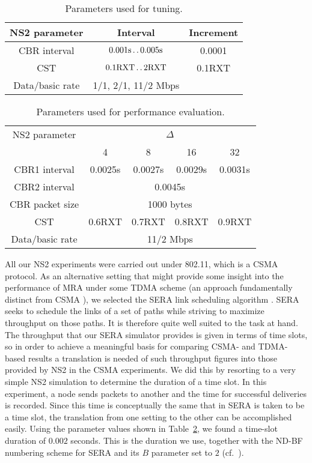 \documentclass{article}
\newcommand{\twoldots}{\mathinner{\ldotp\ldotp}}
\begin{document}
\begin{table}[t]
\centering
\caption{Parameters used for tuning.}
\begin{tabular}{ccc}
\hline
NS2 parameter  & Interval                                    & Increment \\ \hline
CBR interval   & $0.001\textrm{s}\twoldots 0.005\textrm{s}$  & 0.0001    \\
CST            & $0.1\textrm{RXT}\twoldots 2\textrm{RXT}$    & 0.1RXT    \\
Data/basic rate& 1/1, 2/1, 11/2 Mbps                         &           \\
\end{tabular}
 \label{table1}
\end{table}

\begin{table}[t]
\centering
\caption{Parameters used for performance evaluation.}
\begin{tabular}{ccccc}
\hline
NS2 parameter   & \multicolumn{4}{c}{$\Delta$}           \\ \cline{2-5}
                & 4       & 8       & 16      & 32       \\ \hline 
CBR1 interval   & 0.0025s & 0.0027s & 0.0029s & 0.0031s  \\  
CBR2 interval   & \multicolumn{4}{c}{0.0045s}             \\
CBR packet size & \multicolumn{4}{c}{1000 bytes}         \\
CST             & 0.6RXT  & 0.7RXT  & 0.8RXT  & 0.9RXT   \\
Data/basic rate & \multicolumn{4}{c}{11/2 Mbps}          \\
\end{tabular}
 \label{table2}
\end{table}

All our NS2 experiments were carried out under 802.11, which is a CSMA protocol.
As an alternative setting that might provide some insight into the performance
of MRA under some TDMA scheme (an approach fundamentally distinct from CSMA
\cite{Gummalla2000}), we selected the SERA link scheduling algorithm
\cite{Fabio2012}. SERA seeks to schedule the links of a set of paths while
striving to maximize throughput on those paths. It is therefore quite well
suited to the task at hand. The throughput that our SERA simulator provides is
given in terms of time slots, so in order to achieve a meaningful basis for
comparing CSMA- and TDMA-based results a translation is needed of such
throughput figures into those provided by NS2 in the CSMA experiments. We did
this by resorting to a very simple NS2 simulation to determine the duration of
a time slot. In this experiment, a node sends packets to another and the time
for successful deliveries is recorded. Since this time is conceptually the same
that in SERA is taken to be a time slot, the translation from one setting to the
other can be accomplished easily. Using the parameter values shown in
Table~\ref{table2}, we found a time-slot duration of $0.002$ seconds. This is
the duration we use, together with the ND-BF numbering scheme for SERA and its
$B$ parameter set to $2$ (cf.\ \cite{Fabio2012}).
\end{document}
